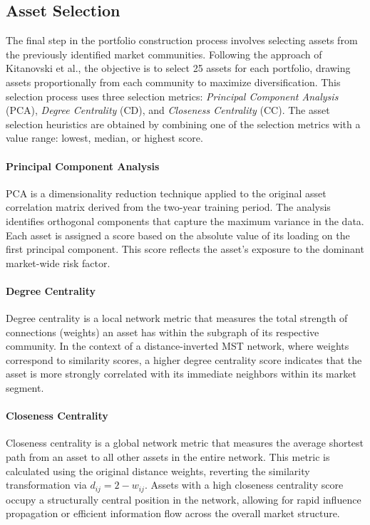 \documentclass[acmsmall,screen,nonacm]{acmart}
\begin{document}
\subsection{Asset Selection}

The final step in the portfolio construction process involves selecting assets from the previously identified market communities.
Following the approach of Kitanovski et al., the objective is to select 25 assets for each portfolio, drawing assets proportionally from each community to maximize diversification.
This selection process uses three selection metrics: \emph{Principal Component Analysis} (PCA), \emph{Degree Centrality} (CD), and \emph{Closeness Centrality} (CC).
The asset selection heuristics are obtained by combining one of the selection metrics with a value range: lowest, median, or highest score.

\paragraph{Principal Component Analysis}

PCA is a dimensionality reduction technique applied to the original asset correlation matrix derived from the two-year training period. The analysis identifies orthogonal components that capture the maximum variance in the data. Each asset is assigned a score based on the absolute value of its loading on the first principal component. This score reflects the asset’s exposure to the dominant market-wide risk factor.

\paragraph{Degree Centrality}

Degree centrality is a local network metric that measures the total strength of connections (weights) an asset has within the subgraph of its respective community.
In the context of a distance-inverted MST network, where weights correspond to similarity scores, a higher degree centrality score indicates that the asset is more strongly correlated with its immediate neighbors within its market segment.

\paragraph{Closeness Centrality}

Closeness centrality is a global network metric that measures the average shortest path from an asset to all other assets in the entire network. This metric is calculated using the original distance weights, reverting the similarity transformation via $d_{ij} = 2 - w_{ij}$.
Assets with a high closeness centrality score occupy a structurally central position in the network, allowing for rapid influence propagation or efficient information flow across the overall market structure.
\end{document}
